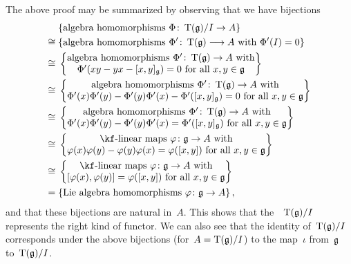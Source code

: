 \begin{remark}
  The above proof may be summarized by observing that we have bijections
  \begin{align*}
    {}&
    \{ \textstyle\text{algebra homomorphisms~$\Phi \colon \Tensor(\glie)/I \to A$} \}
    \\
    \cong{}&
    \{ \text{algebra homomorphisms~$\Phi' \colon \Tensor(\glie) \to A$ with~$\Phi'(I) = 0$} \}
    \\
    \cong{}&
    \left\{
      \begin{tabular}{@{}c@{}}
        algebra homomorphisms~$\Phi' \colon \Tensor(\glie) \to A$ with  \\
        $\Phi'(x y - y x - [x,y]_{\glie}) = 0$ for all~$x, y \in \glie$
      \end{tabular}
    \right\}
    \\
    \cong{}&
    \left\{
      \begin{tabular}{@{}c@{}}
        algebra homomorphisms~$\Phi' \colon \Tensor(\glie) \to A$ with  \\
        $\Phi'(x) \Phi'(y) - \Phi'(y) \Phi'(x) - \Phi'([x,y]_{\glie}) = 0$ for all~$x, y \in \glie$
      \end{tabular}
    \right\}
    \\
    \cong{}&
    \left\{
      \begin{tabular}{@{}c@{}}
        algebra homomorphisms~$\Phi' \colon \Tensor(\glie) \to A$ with  \\
        $\Phi'(x) \Phi'(y) - \Phi'(y) \Phi'(x) = \Phi'([x,y]_{\glie})$ for all~$x, y \in \glie$
      \end{tabular}
    \right\}
    \\
    \cong{}&
    \left\{
      \begin{tabular}{@{}c@{}}
        {\linear{$\kf$}} maps~$\varphi \colon \glie \to A$ with  \\
        $\varphi(x) \varphi(y) - \varphi(y) \varphi(x) = \varphi([x,y])$ for all~$x, y \in \glie$
      \end{tabular}
    \right\}
    \\
    \cong{}&
    \left\{
      \begin{tabular}{@{}c@{}}
        {\linear{$\kf$}} maps~$\varphi \colon \glie \to A$ with  \\
        $[\varphi(x), \varphi(y)] = \varphi([x,y])$ for all~$x, y \in \glie$ 
      \end{tabular}
    \right\}
    \\
    ={}&
    \{ \textstyle\text{Lie~algebra homomorphisms~$\varphi \colon \glie \to A$} \} \,,
  \end{align*}
  and that these bijections are natural in~$A$.
  This shows that the~{\algebra{$\kf$}}~$\operatorname{T}(\mathfrak{g})/I$ represents the right kind of functor.
  We can also see that the identity of~$\operatorname{T}(\mathfrak{g})/I$ corresponds under the above bijections (for~$A = \operatorname{T}(\mathfrak{g})/I$) to the map~$\iota$ from~$\mathfrak{g}$ to~$\operatorname{T}(\mathfrak{g})/I$.
\end{remark}



